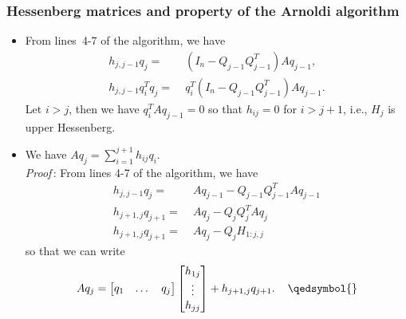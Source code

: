 \documentclass[t,usepdftitle=false]{beamer}
\begin{document}
\begin{frame}
\frametitle{Hessenberg matrices and property of the Arnoldi algorithm}	
\begin{itemize}
\item From lines~4-7 of the algorithm, we have
\begin{align*}
h_{j,j-1}q_j=&\;(I_n-Q_{j-1}Q_{j-1}^T)Aq_{j-1},\\
h_{j,j-1}q_i^Tq_j=&\;q_i^T(I_n-Q_{j-1}Q_{j-1}^T)Aq_{j-1}.
\end{align*}
Let $i>j$, then we have $q_i^TAq_{j-1}=0$ so that $h_{ij}=0$ for $i>j+1$, i.e., $H_j$ is upper Hessenberg.	
\vspace{.1cm}	
\item We have $Aq_j=\sum_{i=1}^{j+1}h_{ij}q_i$.\\
\vspace{.1cm}
\emph{Proof}\,:
From lines 4-7 of the algorithm, we have
\begin{align*}
h_{j,j-1}q_j=&\;Aq_{j-1}-Q_{j-1}Q_{j-1}^TAq_{j-1}\\
h_{j+1,j}q_{j+1}=&\;Aq_{j}-Q_{j}Q_{j}^TAq_{j}\\
h_{j+1,j}q_{j+1}=&\;Aq_{j}-Q_{j}H_{1:j,j}
\end{align*}
\vspace{-.2cm}
so that we can write
\vspace{-.2cm}
\begin{align*}
Aq_{j}=
\left[\begin{matrix}q_1&\dots&q_j\end{matrix}\right]
\left[\begin{matrix}h_{1j}\\\vdots\\h_{jj}\end{matrix}\right]+h_{j+1,j}q_{j+1}.
\hspace{.4cm}\qedsymbol{}
\end{align*}
\end{itemize}
\end{frame} 
\end{document}
